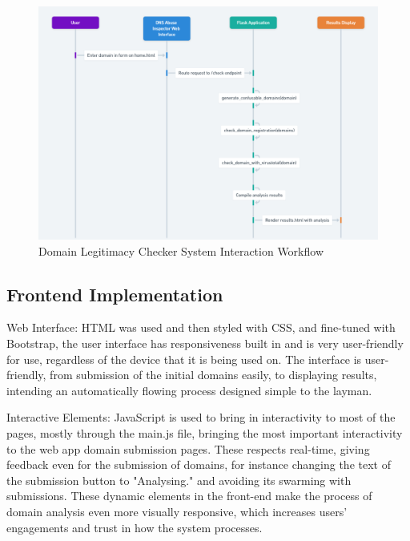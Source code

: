  \begin{figure}[H]
     \centering
     \includegraphics[width=1\linewidth]{project/Domain Legitimacy Check Workflow.png}
     \caption{Domain Legitimacy Checker System Interaction Workflow}
     \label{fig:figfigfig}
 \end{figure}

\subsection{Frontend Implementation}

Web Interface: HTML was used and then styled with CSS, and fine-tuned with Bootstrap, the user interface has responsiveness built in and is very user-friendly for use, regardless of the device that it is being used on. The interface is user-friendly, from submission of the initial domains easily, to displaying results, intending an automatically flowing process designed simple to the layman.


Interactive Elements: JavaScript is used to bring in interactivity to most of the pages, mostly through the main.js file, bringing the most important interactivity to the web app domain submission pages. These respects real-time, giving feedback even for the submission of domains, for instance changing the text of the submission button to "Analysing." and avoiding its swarming with submissions. These dynamic elements in the front-end make the process of domain analysis even more visually responsive, which increases users' engagements and trust in how the system processes.

